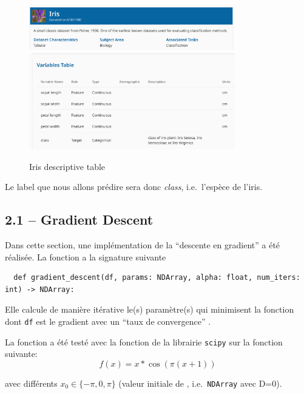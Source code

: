 \documentclass[
]{article}
\begin{document}
\begin{figure}
\centering
\includegraphics[width=0.8\textwidth,height=\textheight]{../res/iris_img.png}
\includegraphics[width=0.8\textwidth,height=\textheight]{../res/iris_table.png}
\caption{Iris descriptive table}
\end{figure}

Le label que nous allons prédire sera donc \emph{class}, i.e.~l'espèce
de l'iris.

\newpage

\hypertarget{gradient-descent}{%
\subsection{2.1 -- Gradient Descent}\label{gradient-descent}}

Dans cette section, une implémentation de la ``descente en gradient'' a
été réalisée. La fonction a la signature suivante

\begin{lstlisting}
  def gradient_descent(df, params: NDArray, alpha: float, num_iters: int) -> NDArray:  
\end{lstlisting}

Elle calcule de manière itérative le(s) paramètre(s)  qui
minimisent la fonction dont \texttt{df} est le gradient avec un ``taux
de convergence'' .

La fonction a été testé avec la fonction 
\cite{ScipyOptimizeFmin} de la librairie \texttt{scipy} sur la fonction
suivante: \[
f(x) = x * \cos(\pi  (x + 1))
\]

avec différents \(x_0 \in \{-\pi, 0, \pi\}\) (valeur initiale de
, i.e.~\texttt{NDArray} avec D=0).
\end{document}
